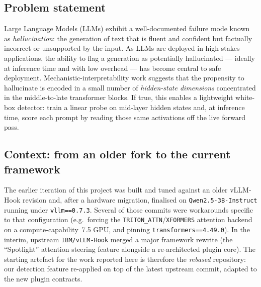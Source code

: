 \documentclass[11pt]{article}
\begin{document}
\subsection{Problem statement}
Large Language Models (LLMs) exhibit a well-documented failure mode known as
\emph{hallucination}: the generation of text that is fluent and confident but factually
incorrect or unsupported by the input. As LLMs are deployed in high-stakes applications, the
ability to flag a generation as potentially hallucinated --- ideally at inference time and
with low overhead --- has become central to safe deployment. Mechanistic-interpretability
work suggests that the propensity to hallucinate is encoded in a small number of
\emph{hidden-state dimensions} concentrated in the middle-to-late transformer blocks. If
true, this enables a lightweight white-box detector: train a linear probe on mid-layer hidden
states and, at inference time, score each prompt by reading those same activations off the
live forward pass.

\subsection{Context: from an older fork to the current framework}
The earlier iteration of this project was built and tuned against an older vLLM-Hook revision
and, after a hardware migration, finalised on \texttt{Qwen2.5-3B-Instruct} running under
\texttt{vllm==0.7.3}. Several of those commits were workarounds specific to that
configuration (e.g.\ forcing the \texttt{TRITON\_ATTN}/\texttt{XFORMERS} attention backend on
a compute-capability~7.5 GPU, and pinning \texttt{transformers==4.49.0}). In the interim,
upstream \texttt{IBM/vLLM-Hook} merged a major framework rewrite (the ``Spotlight'' attention
steering feature alongside a re-architected plugin core). The starting artefact for the work
reported here is therefore the \emph{rebased} repository: our detection feature re-applied on
top of the latest upstream commit, adapted to the new plugin contracts.
\end{document}
